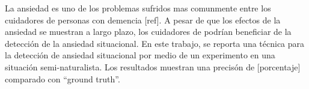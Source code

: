 La ansiedad es uno de los problemas sufridos mas comunmente entre los cuidadores de personas con demencia [ref]. A pesar de que los efectos de la ansiedad se muestran a largo plazo, los cuidadores de podr\'ian beneficiar de la detecci\'on de la ansiedad situacional. En este trabajo, se reporta una t\'ecnica para la detecci\'on de ansiedad situacional por medio de un experimento en una situaci\'on semi-naturalista. Los resultados muestran una precis\'on de [porcentaje] comparado con  ``ground truth''.
